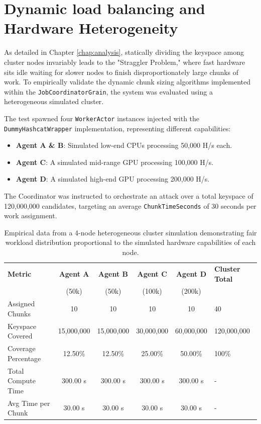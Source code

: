 \section{Dynamic load balancing and Hardware Heterogeneity}
As detailed in Chapter \ref{chap:analysis}, statically dividing the keyspace among cluster nodes invariably leads to the "Straggler Problem," where fast hardware sits idle waiting for slower nodes to finish disproportionately large chunks of work. To empirically validate the dynamic chunk sizing algorithms implemented within the \verb|JobCoordinatorGrain|, the system was evaluated using a heterogeneous simulated cluster.

The test spawned four \verb|WorkerActor| instances injected with the \verb|DummyHashcatWrapper| implementation, representing different capabilities:
\begin{itemize}
    \item \textbf{Agent A \& B}: Simulated low-end CPUs processing 50,000 H/s each.
    \item \textbf{Agent C}: A simulated mid-range GPU processing 100,000 H/s.
    \item \textbf{Agent D}: A simulated high-end GPU processing 200,000 H/s.
\end{itemize}

The Coordinator was instructed to orchestrate an attack over a total keyspace of 120,000,000 candidates, targeting an average \verb|ChunkTimeSeconds| of 30 seconds per work assignment.

\begin{table}[hbt]
\centering
\caption{Empirical data from a 4-node heterogeneous cluster simulation demonstrating fair workload distribution proportional to the simulated hardware capabilities of each node.}
\label{tab:load-balancing-evaluation}
\footnotesize
\begin{tabular}{|l|c|c|c|c|l|}
\hline
\textbf{Metric} & \textbf{Agent A} & \textbf{Agent B} & \textbf{Agent C} & \textbf{Agent D} & \textbf{Cluster Total} \\ 
 & (50k) & (50k) & (100k) & (200k) & \\ \hline
Assigned Chunks & 10 & 10 & 10 & 10 & 40 \\ \hline
Keyspace Covered & 15,000,000 & 15,000,000 & 30,000,000 & 60,000,000 & 120,000,000 \\ \hline
Coverage Percentage & 12.50\% & 12.50\% & 25.00\% & 50.00\% & 100\% \\ \hline
Total Compute Time & 300.00 s & 300.00 s & 300.00 s & 300.00 s & - \\ \hline
Avg Time per Chunk & 30.00 s & 30.00 s & 30.00 s & 30.00 s & - \\ \hline
\end{tabular}
\end{table}

